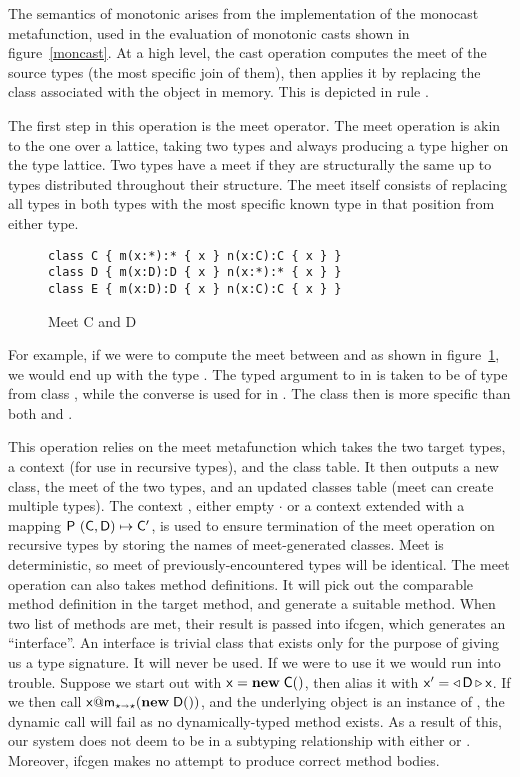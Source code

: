 \documentclass[sigconf]{acmart}
\begin{document}
The semantics of monotonic arises from the implementation of the monocast
metafunction, used in the evaluation of monotonic casts shown in
figure~\ref{moncast}. At a high level, the cast operation computes the
meet of the source types (the most specific join of them), then applies it
by replacing the class associated with the object in memory. This is depicted
in rule .

The first step in this operation is the meet operator. The meet operation is
akin to the one over a lattice, taking two types and always producing a type
higher on the type lattice. Two types have a meet if they are structurally
the same up to \any types distributed throughout their structure. The meet
itself consists of replacing all \any types in both types with the most
specific known type in that position from either type.

\begin{figure}[h]
\begin{lstlisting}
class C { m(x:*):* { x } n(x:C):C { x } }
class D { m(x:D):D { x } n(x:*):* { x } }
class E { m(x:D):D { x } n(x:C):C { x } }
\end{lstlisting}
\caption{Meet C and D}
\label{fig:meetex}
\end{figure}

\noindent
For example, if we were to compute the meet between \C and \D as  shown in
figure~\ref{fig:meetex}, we would end up with the type . The \any typed
argument to \m in \C is taken to be of type \D from class \D, while the
converse is used for \n in \D. The class  then is more specific than
both \C and \D.

This operation relies on the meet metafunction which takes the two target
types, a context (for use in recursive types), and the class table. It then
outputs a new class, the meet of the two types, and an updated classes table
(meet can create multiple types). The context , either empty $\cdot$
or a context extended with a mapping $\P ~{{(\C,\D)}\mapsto\Cp}$, is used to
ensure termination of the meet operation on recursive types by storing the
names of meet-generated classes. Meet is deterministic, so meet of
previously-encountered types will be identical.  The meet operation can also
takes method definitions. It will pick out the comparable method definition
in the target method, and generate a suitable method. When two list of
methods are met, their result is passed into ifcgen, which generates an
``interface''. An interface is trivial class that exists only for the
purpose of giving us a type signature.  It will never be used.  If we were
to use it we would run into trouble.  Suppose we start out with
$\x=\New\C{}$, then alias it with $\xp=\MonCast\D\x$. If we then call
$\DynCall\x\m{\New\D{}}$, and the underlying object is an instance of
, the dynamic call will fail as no dynamically-typed method exists. As
a result of this, our system does not deem  to be in a subtyping
relationship with either \C or \D. Moreover, ifcgen makes no attempt to
produce correct method bodies.
\end{document}
